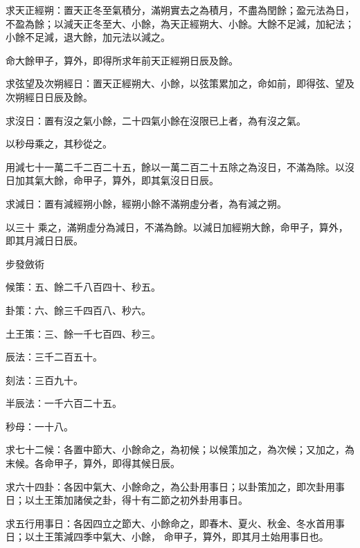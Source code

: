 \begin{pinyinscope}
 求天正經朔：置天正冬至氣積分，滿朔實去之為積月，不盡為閏餘；盈元法為日，不盈為餘；以減天正冬至大、小餘，為天正經朔大、小餘。大餘不足減，加紀法；小餘不足減，退大餘，加元法以減之。



 命大餘甲子，算外，即得所求年前天正經朔日辰及餘。



 求弦望及次朔經日：置天正經朔大、小餘，以弦策累加之，命如前，即得弦、望及次朔經日日辰及餘。



 求沒日：置有沒之氣小餘，二十四氣小餘在沒限已上者，為有沒之氣。



 以秒母乘之，其秒從之。



 用減七十一萬二千二百二十五，餘以一萬二百二十五除之為沒日，不滿為除。以沒日加其氣大餘，命甲子，算外，即其氣沒日日辰。



 求減日：置有減經朔小餘，經朔小餘不滿朔虛分者，為有減之朔。



 以三十
 乘之，滿朔虛分為減日，不滿為餘。以減日加經朔大餘，命甲子，算外，即其月減日日辰。



 步發斂術



 候策：五、餘二千八百四十、秒五。



 卦策：六、餘三千四百八、秒六。



 土王策：三、餘一千七百四、秒三。



 辰法：三千二百五十。



 刻法：三百九十。



 半辰法：一千六百二十五。



 秒母：一十八。



 求七十二候：各置中節大、小餘命之，為初候；以候策加之，為次候；又加之，為末候。各命甲子，算外，即得其候日辰。



 求六十四卦：各因中氣大、小餘命之，為公卦用事日；以卦策加之，即次卦用事日；以土王策加諸侯之卦，得十有二節之初外卦用事日。



 求五行用事日：各因四立之節大、小餘命之，即春木、夏火、秋金、冬水首用事日；以土王策減四季中氣大、小餘，
 命甲子，算外，即其月土始用事日也。




\end{pinyinscope}
